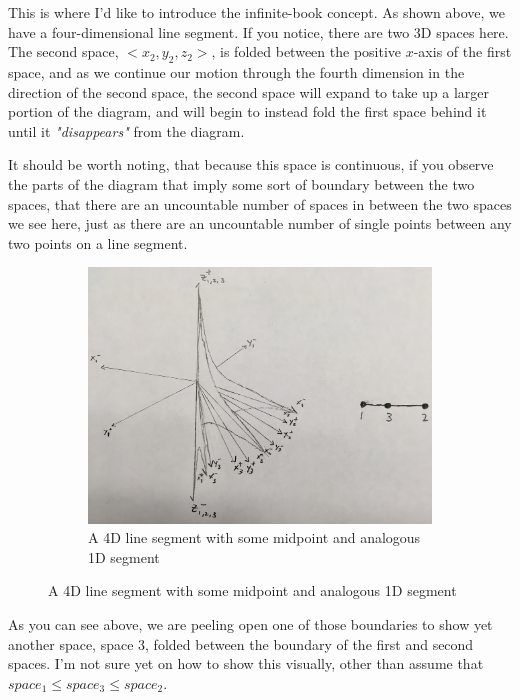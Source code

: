 \documentclass[20pt]{article} %
\begin{document}
This is where I'd like to introduce the infinite-book concept.  As shown above, we have a four-dimensional line segment. If you notice, there are two 3D spaces here.  
The second space, $<x_2, y_2, z_2>$, is folded between the positive $x$-axis of the first space, and as we continue our motion through the fourth dimension in the direction of the second space, the second space will expand to take up a larger portion of the diagram, and will begin to instead fold the first space behind it until it \textit{"disappears"} from the diagram.

It should be worth noting, that because this space is continuous, if you observe the parts of the diagram that imply some sort of boundary between the two spaces, that there are an uncountable number of spaces in between the two spaces we see here, just as there are an uncountable number of single points between any two points on a line segment.

\begin{figure}[!htbp]
  	\centering
   	\begin{subfigure}[p]{1.0\linewidth}
    	\includegraphics[width=\linewidth]{./figures/fig4.jpg}
	\caption{A 4D line segment with some midpoint and analogous 1D segment}
	\label{fig:sub1}
   	\end{subfigure}
\end{figure} 

As you can see above, we are peeling open one of those boundaries to show yet another space, space $3$, folded between the boundary of the first and second spaces.  I'm not sure yet on how to show this visually, other than assume that $space_1 \leq space_3 \leq space_2$. \\ 
\end{document}
